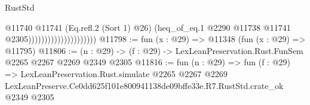 \begin{lexlean}{RustStd}
\begin{coremodule}
                                          @11740
                                            @11741
                                            (Eq.refl.{2} (Sort 1) @26)
                                            (heq_of_eq.{1}
                                              @2290
                                              @11738
                                              @11741
                                              @2305)))))))))))))))))))))
@11798 := fun (x : @29) => @11348 (fun (x : @29) => @11795)
@11806 := (n : @29) -> (f : @29) -> LexLeanPreservation.Rust.FunSem @2265 @2267 @2269 @2349 @2305
@11816 := fun (n : @29) =>
  fun (f : @29) =>
  LexLeanPreservation.Rust.simulate
    @2265
    @2267
    @2269
    LexLeanPreserve.Ce0dd625f101e800941138de09bffe33e.R7.RustStd.crate_ok
    @2349
    @2305
\end{coremodule}
\end{lexlean}
